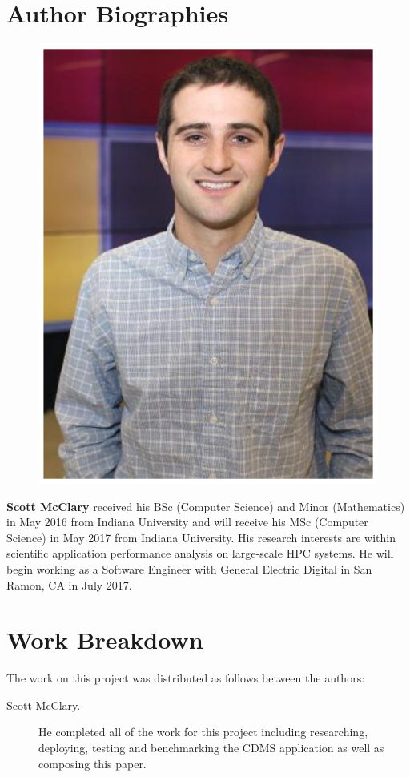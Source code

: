 \documentclass[9pt,twocolumn,twoside]{../../styles/osajnl}
\begin{document}
 
\section*{Author Biographies}
\begingroup
\setlength\intextsep{0pt}
\begin{minipage}[t][3.2cm][t]{1.0\columnwidth} 
  \begin{figure}
    \includegraphics[width=0.25\columnwidth]{images/scott_mcclary}
  \end{figure}
  \noindent
  {\bfseries Scott McClary} received his BSc (Computer Science) and
  Minor (Mathematics) in May 2016 from Indiana University and will
  receive his MSc (Computer Science) in May 2017 from Indiana
  University. His research interests are within scientific application
  performance analysis on large-scale HPC systems. He will begin
  working as a Software Engineer with General Electric Digital in San
  Ramon, CA in July 2017.
\end{minipage}
\endgroup

\section*{} %
\section*{Work Breakdown}
The work on this project was distributed as follows between the
authors:
\begin{description}
\item[Scott McClary.] He completed all of the work for this project
  including researching, deploying, testing and benchmarking the CDMS
  application as well as composing this paper.
\end{description}


\end{document}
